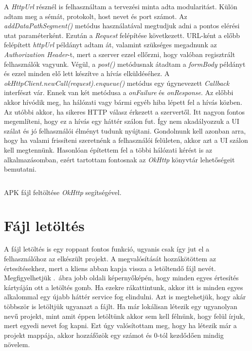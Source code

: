 \documentclass{thesis-ekf}
\theoremstyle{definition}
\theoremstyle{remark}
\begin{document}
A \emph{HttpUrl} résznél is felhasználtam a tervezési minta adta modularitást.
Külön adtam meg a sémát, protokolt, host nevet és port számot.
Az \emph{addDataPathSegment()} metódus használatával megtudjuk adni a pontos elérési utat paraméterként.
Ezután a \emph{Request} felépítése következett. 
URL-ként a előbb felépített \emph{httpUrl} példányt adtam át, valamint szükséges megadnunk az \emph{Authorization Header}-t, mert a szerver ezzel ellőrzni, hogy valóban regisztrált felhasználók vagyunk.
Végül, a \emph{post()} metódusnak átadtam a \emph{formBody} példányt és ezzel minden elő lett készítve a hívás elküldéséhez.
A \emph{okHttpClient.newCall(request).enqueue()} metódus egy úgynevezett \emph{Callback} interfészt vár.
Ennek van két metódusa a \emph{onFailure} és \emph{onResponse}.
Az előbbi akkor hívódik meg, ha hálózati vagy bármi egyéb hiba lépett fel a hívás közben.
Az utóbbi akkor, ha sikeres HTTP válasz érkezett a szervertől.
Itt nagyon fontos megemlíteni, hogy ez a hívás egy háttér szálon fut.
Így nem akadályozzuk a UI szálat és jó felhasználói élményt tudunk nyújtani.
Gondolnunk kell azonban arra, hogy ha valami frissíteni szeretnénk a felhasználói felületen, akkor azt a UI szálon kell megtennünk.
Hasonlóan építettem fel a többi hálózati kérést is az alkalmazásomban, ezért tartottam fontosnak az \emph{OkHttp} könyvtár lehetőségeit bemutatni.

\inputminted[linenos, breaklines]{java}{./codes/okhttp.java}
\begin{listing}[H]
    \caption{APK fájl feltöltése \emph{OkHttp} segítségével.}
    \label{okhttp_example}
\end{listing}

\section{Fájl letöltés}

A fájl letöltés is egy roppant fontos funkció, ugyanis csak így jut el a felhasználóhoz az elkészült projekt.
A megvalósítását hozzákötöttem az értesítésekhez, mert a kliens abban kapja vissza a letöltendő fájl nevét.
Megfigyelhetjük .~ábra jobb oldali képernyőképén, hogy minden egyes értesítés kártyáján ott a letöltés gomb.
Ha ezekre rákattintunk, akkor itt is minden egyes alkalommal egy újabb háttér service fog elindulni.
Azt is megtehetjük, hogy akár többször is letöltjük ugyanazt a fájlt.
Ha már lokálisan létezik egy ugyanolyan nevű projekt, mint amit éppen letöltünk akkor sem kell félnünk, hogy felül írjuk, mert egyedi nevet fog kapni.
Ezt úgy valósítottam meg, hogy ha létezik már a projekt mappája, akkor hozzáfőzök egy számot és 0-tól kezdődően mindig növelem.
\end{document}
